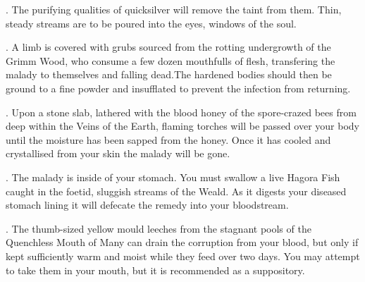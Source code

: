 {{\hrulefill



  \item {}. The purifying qualities of quicksilver will remove the taint from them. Thin, steady streams are to be poured into the eyes, windows of the soul. 


\hrulefill



  \item {}. A limb is covered with grubs sourced from the rotting undergrowth of the Grimm Wood, who consume a few dozen mouthfulls of flesh, transfering the malady to themselves and falling dead.The hardened bodies should then be ground to a fine powder and insufflated to prevent the infection from returning. 


\hrulefill



  \item {}. Upon a stone slab, lathered with the blood honey of the spore-crazed bees from deep within the Veins of the Earth, flaming torches will be passed over your body until the moisture has been sapped from the honey. Once it has cooled and crystallised from your skin the malady will be gone. 


\hrulefill



  \item {}. The malady is inside of your stomach. You must swallow a live Hagora Fish caught in the foetid, sluggish streams of the Weald. As it digests your diseased stomach lining it will defecate the remedy into your bloodstream.  


\hrulefill



  \item {}. The thumb-sized yellow mould leeches from the stagnant pools of the Quenchless Mouth of Many can drain the corruption from your blood, but only if kept sufficiently warm and moist while they feed over two days. You may attempt to take them in your mouth, but it is recommended as a suppository. 

}}
